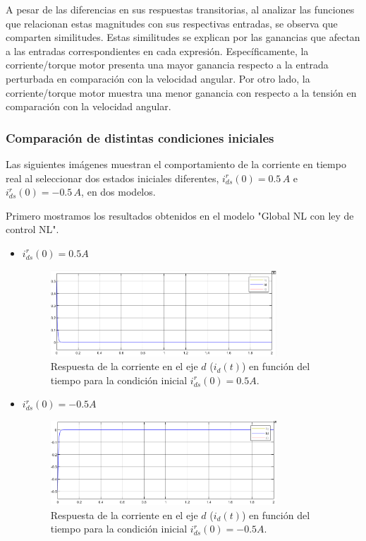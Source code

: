 \documentclass{article}
\begin{document}
A pesar de las diferencias en sus respuestas transitorias, al analizar las funciones que relacionan 
estas magnitudes con sus respectivas entradas, se observa que comparten similitudes. Estas similitudes 
se explican por las ganancias que afectan a las entradas correspondientes en cada expresión. 
Específicamente, la corriente/torque motor presenta una mayor ganancia respecto a la entrada perturbada 
en comparación con la velocidad angular. Por otro lado, la corriente/torque motor muestra una menor 
ganancia con respecto a la tensión en comparación con la velocidad angular.

\subsubsection{Comparación de distintas condiciones iniciales}

Las siguientes imágenes muestran el comportamiento de la corriente en tiempo real al seleccionar dos 
estados iniciales diferentes, $i^r_{ds}(0) = 0.5 \, A$ e $i^r_{ds}(0) = -0.5 \, A$, en dos modelos.

Primero mostramos los resultados obtenidos en el modelo "Global NL con ley de control NL".

\begin{itemize}
    \item $i^r_{ds}(0) = 0.5 A$
    
    \begin{figure}[H]
        \centering
        \includegraphics[width=0.8\textwidth]{5.1.6_cid1.png}
        \caption{Respuesta de la corriente en el eje $d$ ($i_d(t)$) en función del tiempo para la condición inicial $i^r_{ds}(0) = 0.5 A$.}
    \end{figure}

    \item $i^r_{ds}(0) = -0.5 A$
    
    \begin{figure}[H]
        \centering
        \includegraphics[width=0.8\textwidth]{5.1.6_cid2.png}
        \caption{Respuesta de la corriente en el eje $d$ ($i_d(t)$) en función del tiempo para la condición inicial $i^r_{ds}(0) = -0.5 A$.}
    \end{figure}
\end{itemize}
\end{document}
